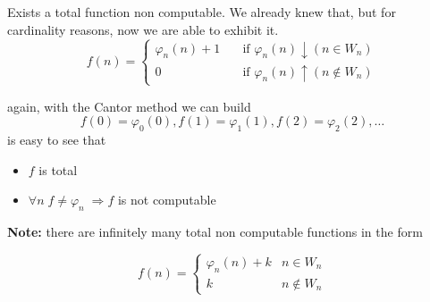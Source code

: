 \begin{exercise}
  Exists a total function non computable. We already knew that, but for
  cardinality reasons, now we are able to exhibit it.
  \[
    f(n) = \begin{cases}

      \varphi_n(n) + 1 & \quad \mbox{if } \varphi_n(n) \downarrow (n
      \in W_n) \\

       0 & \quad \mbox{if } \varphi_n(n)\uparrow (n \notin W_n)
    \end{cases}
  \]

  again, with the Cantor method we can build
  \[f(0) = \varphi_0(0), f(1) = \varphi_1(1), f(2) = \varphi_2(2),
    \dots \]
  is easy to see that
  \begin{itemize}
  \item $f$ is total
  \item $\forall n \; f \neq \varphi_n \; \Rightarrow f$ is not
    computable
  \end{itemize}
\end{exercise}

\textbf{Note:} there are infinitely many total non computable
functions in the form

\[
  f(n)  = \begin{cases}
    \varphi_n(n) + k & n \in W_n \\
    k & n \notin W_n
  \end{cases}
\]

